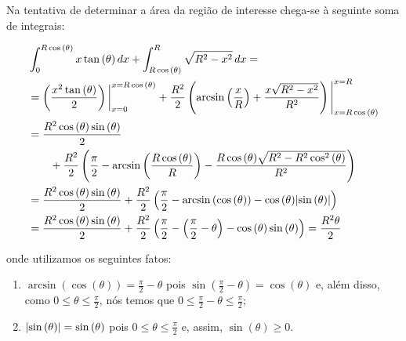 \begin{figure}[H]
  \centering
\end{figure}

\begin{figure}[H]
  \centering
\end{figure}

\begin{figure}[H]
  \centering
\end{figure}

Na tentativa de determinar a área da região de interesse chega-se à seguinte
soma de integrais:

\begin{align*}
  &\int_{0}^{R\cos{(\theta)}}x\tan{(\theta)}\,dx
  +
  \int_{R\cos{(\theta)}}^{R}\sqrt{R^{2}-x^{2}}\,dx
  =
  \\
  &=
  \left(
    \frac{x^{2}\tan{(\theta)}}{2}
  \right)
  \bigg{\vert}_{x=0}^{x=R\cos{(\theta)}}
    +
  \frac{R^{2}}{2}
  \left(
    \arcsin{\left(\frac{x}{R}\right)}
    +
    \frac{x\sqrt{R^{2}-x^{2}}}{R^{2}}
  \right)
  \Bigg{\vert}_{x=R\cos{(\theta)}}^{x=R}
  \\
  &=
  \frac{R^{2}\cos{(\theta)\sin{(\theta)}}}{2}
  \\
  &\qquad
  +
  \frac{R^{2}}{2}
  \left(
    \frac{\pi}{2}
    -
    \arcsin{\left(\frac{R\cos{(\theta)}}{R}\right)}
    -
    \frac{R\cos{(\theta)}\sqrt{R^{2}-R^{2}\cos^{2}{(\theta)}}}{R^{2}}
  \right)
  \\
  &=
  \frac{R^{2}\cos{(\theta)\sin{(\theta)}}}{2}
  +
  \frac{R^{2}}{2}
  \left(
    \frac{\pi}{2}
    -
    \arcsin{(\cos{(\theta)})}
    -
    \cos{(\theta)}\lvert\sin{(\theta)}\rvert
  \right)
  \\
  &=
  \frac{R^{2}\cos{(\theta)\sin{(\theta)}}}{2}
  +
  \frac{R^{2}}{2}
  \left(
    \frac{\pi}{2}
    -
    \left(\frac{\pi}{2}-\theta\right)
    -
    \cos{(\theta)}\sin{(\theta)}
  \right)
  =
  \frac{R^{2}\theta}{2}
\end{align*}

onde utilizamos os seguintes fatos:

\begin{enumerate}
  \item
    \(\arcsin{(\cos{(\theta)})}=\frac{\pi}{2}-\theta\) pois
    \(\sin{(\frac{\pi}{2}-\theta)}=\cos{(\theta)}\) e, além disso, como
    \(0\leqslant{\theta}\leqslant{\frac{\pi}{2}}\), nós temos que
    \(0\leqslant{\frac{\pi}{2}-\theta}\leqslant{\frac{\pi}{2}}\);
  \item
    \(\lvert\sin{(\theta)}\rvert=\sin{(\theta)}\) pois
    \(0\leqslant{\theta}\leqslant{\frac{\pi}{2}}\) e, assim,
    \(\sin{(\theta)}\geqslant{0}\).
\end{enumerate}
